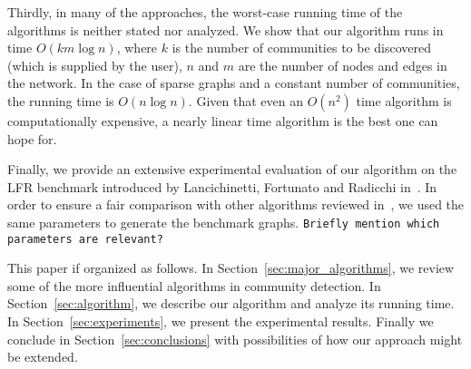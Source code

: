 Thirdly, in many of the approaches, the worst-case running time of the algorithms 
is neither stated nor analyzed. We show that our algorithm runs in time $O(k m \log n)$, 
where $k$ is the number of communities to be discovered (which is supplied by the user), 
$n$ and $m$ are the number of nodes and edges in the network. In the case of sparse graphs 
and a constant number of communities, the running time is $O(n \log n)$. Given that even 
an $O(n^2)$ time algorithm is computationally expensive, a nearly linear time algorithm 
is the best one can hope for.

Finally, we provide an extensive experimental evaluation of our algorithm on the LFR benchmark
introduced by Lancichinetti, Fortunato and Radicchi in~\cite{LFR08, LF09}. In order to ensure 
a fair comparison with other algorithms reviewed in~\cite{LF09}, we used the same parameters 
to generate the benchmark graphs. \texttt{Briefly mention which parameters are relevant?}


This paper if organized as follows. In Section~\ref{sec:major_algorithms}, we review some 
of the more influential algorithms in community detection. In Section~\ref{sec:algorithm}, we 
describe our algorithm and analyze its running time. In Section~\ref{sec:experiments}, we present 
the experimental results. Finally we conclude in Section~\ref{sec:conclusions} with possibilities
of how our approach might be extended. 



